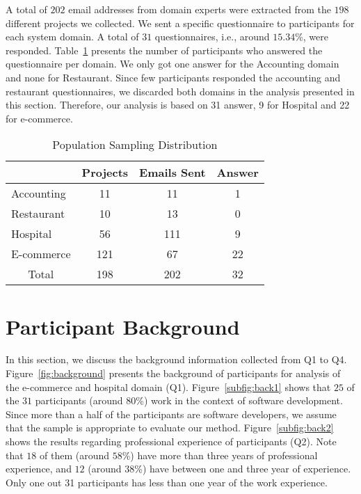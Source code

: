 A total of $202$ email addresses from domain experts  were  extracted from the $198$ different projects we collected. We sent a specific questionnaire to participants for each system domain. A total of $31$ questionnaires, i.e., around $15.34$\%, were responded. Table~\ref{tab:survey} presents the number of  participants who answered the questionnaire per domain. We only got one answer for the Accounting domain and none for Restaurant. Since few participants responded the accounting and restaurant questionnaires, we discarded both domains in the analysis presented in this section. Therefore, our analysis is based on 31 answer, 9 for Hospital and  22 for e-commerce.

\begin{table}[!h]
\centering
\caption{Population Sampling Distribution}
\label{tab:survey}
\scriptsize
\begin{tabular}{|l|c|c|c|}
\hline
\rowcolor[HTML]{EFEFEF} 
\multicolumn{1}{|c|}{\cellcolor[HTML]{EFEFEF}\textbf{Domain}} & \textbf{Projects} & \textbf{Emails Sent} & \textbf{Answer} \\ \hline
Accounting                                           & 11       & 11           & 1      \\ \hline
Restaurant                                           & 10       & 13           & 0      \\ \hline
Hospital                                             & 56       & 111          & 9      \\ \hline
E-commerce                                           & 121      & 67           & 22     \\ \hline
\multicolumn{1}{|c|}{Total}                          & 198      & 202          & 32     \\ \hline
\end{tabular}
\end{table}


\section{Participant Background}
\label{ch5sc:background}

In this section, we discuss the background information collected from Q1 to Q4. Figure~\ref{fig:background} presents the background of participants for  analysis of the e-commerce and  hospital domain (Q1). Figure~\ref{subfig:back1} shows that $25$ of the $31$ participants (around 80\%) work in the context of software development. Since more than a half of the participants are software developers, we assume that the sample is appropriate to evaluate our method. Figure~\ref{subfig:back2}
shows the results regarding professional experience of participants (Q2). Note that $18$ of them (around $58$\%)  have more than three years of professional experience, and $12$ (around $38$\%) have between one and three year of experience. Only one out 31 participants has less than one year of the work experience. 

